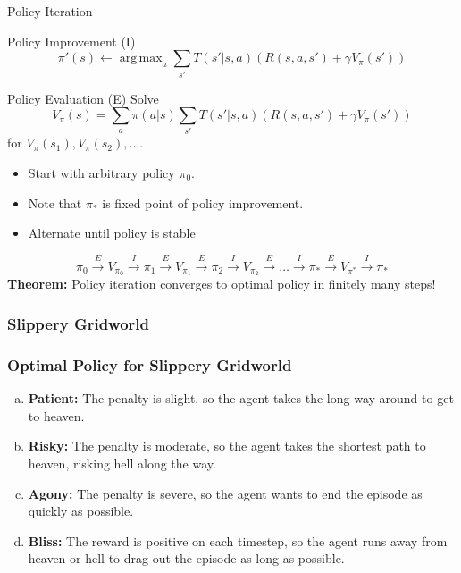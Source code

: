 \documentclass[10pt,a4paper]{beamer}
\DeclareMathOperator*{\argmax}{arg\,max}
\newcommand{\iter}{\xrightarrow{I}}
\newcommand{\eval}{\xrightarrow{E}}
\begin{document}
\begin{frame}{Policy Iteration}

\begin{block}{Policy Improvement (I)}
	$$
	\pi'(s) \leftarrow \argmax_a \sum_{s'} T(s' | s,a) 
	\left( R(s,a,s') + \gamma V_{\pi}(s') \right)
	$$
\end{block}

	\begin{block}{Policy Evaluation (E)}
	Solve
	$$
	V_\pi(s) = \sum_{a} \pi(a | s) \sum_{s'} T(s' | s, a) \left( R(s,a,s') + \gamma V_\pi(s') \right) 
	$$ for $V_\pi(s_1), V_\pi(s_2), \ldots$.
\end{block}

\pause
\begin{itemize}
	\item Start with arbitrary policy $\pi_0$.
	\item Note that $\pi_*$ is fixed point of policy improvement.
	\item Alternate until policy is stable
\end{itemize}
$$
\pi_0 \eval V_{\pi_0} \iter \pi_1 \eval V_{\pi_1} \eval \pi_2 \iter V_{\pi_2}
\eval \ldots \iter \pi_* \eval V_{\pi^*} \iter \pi_* 
$$
\pause
\textbf{Theorem:} Policy iteration converges to optimal policy in finitely 
many steps!
\end{frame}


\begin{frame}
    \frametitle{Slippery Gridworld}
    
\end{frame}

\begin{frame}
    \frametitle{Optimal Policy for Slippery Gridworld}
    
    \vspace{-1.3cm}
    \pause
    \begin{enumerate}[(a)]
        \item \textbf{Patient:} The penalty is slight, so the agent takes the long way around to get to heaven.
        \pause
        \item \textbf{Risky:} The penalty is moderate, so the agent takes the shortest path to heaven, risking hell
        along the way.
        \pause
        \item \textbf{Agony:} The penalty is severe, so the agent wants to end the episode as quickly as possible.
        \pause
        \item \textbf{Bliss:} The reward is positive on each timestep, 
		so the agent runs away from heaven or hell to drag out the episode as long as possible.  
    \end{enumerate}
\end{frame}
\end{document}
